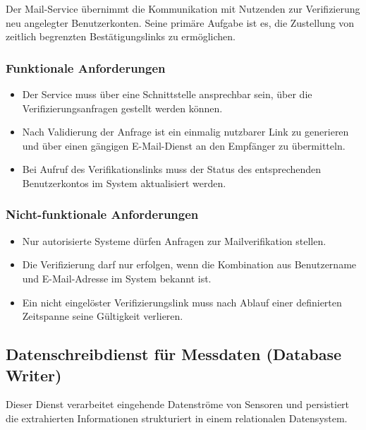Der Mail-Service übernimmt die Kommunikation mit Nutzenden zur Verifizierung neu angelegter Benutzerkonten. Seine primäre Aufgabe ist es, die Zustellung von zeitlich begrenzten Bestätigungslinks zu ermöglichen.

\subsubsection{Funktionale Anforderungen}
\begin{itemize}
  \item Der Service muss über eine Schnittstelle ansprechbar sein, über die Verifizierungsanfragen gestellt werden können.
  \item Nach Validierung der Anfrage ist ein einmalig nutzbarer Link zu generieren und über einen gängigen E-Mail-Dienst an den Empfänger zu übermitteln.
  \item Bei Aufruf des Verifikationslinks muss der Status des entsprechenden Benutzerkontos im System aktualisiert werden.
\end{itemize}

\subsubsection{Nicht-funktionale Anforderungen}
\begin{itemize}
  \item Nur autorisierte Systeme dürfen Anfragen zur Mailverifikation stellen.
  \item Die Verifizierung darf nur erfolgen, wenn die Kombination aus Benutzername und E-Mail-Adresse im System bekannt ist.
  \item Ein nicht eingelöster Verifizierungslink muss nach Ablauf einer definierten Zeitspanne seine Gültigkeit verlieren.
\end{itemize}

\subsection{Datenschreibdienst für Messdaten (Database Writer)}

Dieser Dienst verarbeitet eingehende Datenströme von Sensoren und persistiert die extrahierten Informationen strukturiert in einem relationalen Datensystem.

